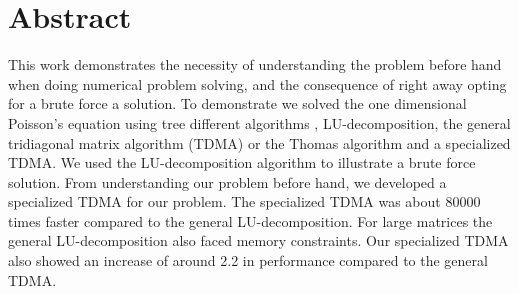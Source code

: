 \section*{Abstract}
This work demonstrates the necessity of understanding the problem
before hand when doing numerical problem solving, and the consequence of right
away opting for a brute force a solution. To demonstrate we solved the one
dimensional
Poisson's equation using tree different algorithms
, LU-decomposition, the general tridiagonal matrix algorithm (TDMA) or the
Thomas algorithm \cite{tridia} and a specialized TDMA.
We used the LU-decomposition algorithm to illustrate a brute force solution.
From understanding our problem before hand, we developed a specialized TDMA for
our problem. The specialized TDMA was about
80000 times faster compared to the general LU-decomposition. For large
matrices the general LU-decomposition also faced memory constraints. Our
specialized TDMA also showed an increase of around 2.2 in performance compared to the general TDMA.
